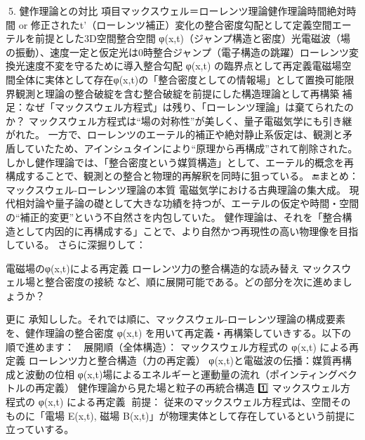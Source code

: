 \documentclass{article}
\begin{document}
🧠5. 健作理論との対比
項目マックスウェル＝ローレンツ理論健作理論時間絶対時間 or 修正されたt'（ローレンツ補正）変化の整合密度勾配として定義空間エーテルを前提とした3D空間整合空間 φ(x,t)（ジャンプ構造と密度）光電磁波（場の振動）、速度一定と仮定光は0時整合ジャンプ（電子構造の跳躍）ローレンツ変換光速度不変を守るために導入整合勾配 φ(x,t) の臨界点として再定義電磁場空間全体に実体として存在φ(x,t)の「整合密度としての情報場」として置換可能限界観測と理論の整合破綻を含む整合破綻を前提にした構造理論として再構築📌補足：なぜ「マックスウェル方程式」は残り、「ローレンツ理論」は棄てられたのか？
マックスウェル方程式は“場の対称性”が美しく、量子電磁気学にも引き継がれた。
一方で、ローレンツのエーテル的補正や絶対静止系仮定は、観測と矛盾していたため、アインシュタインにより“原理から再構成”されて削除された。
しかし健作理論では、「整合密度という媒質構造」として、エーテル的概念を再構成することで、観測との整合と物理的再解釈を同時に狙っている。
🔚まとめ：マックスウェル-ローレンツ理論の本質
電磁気学における古典理論の集大成。
現代相対論や量子論の礎として大きな功績を持つが、エーテルの仮定や時間・空間の“補正的変更”という不自然さを内包していた。
健作理論は、それを「整合構造として内因的に再構成する」ことで、より自然かつ再現性の高い物理像を目指している。
さらに深掘りして：

電磁場のφ(x,t)による再定義
ローレンツ力の整合構造的な読み替え
マックスウェル場と整合密度の接続
など、順に展開可能である。どの部分を次に進めましょうか？

更に
承知しした。それでは順に、マックスウェル-ローレンツ理論の構成要素を、健作理論の整合密度 φ(x,t) を用いて再定義・再構築していきする。以下の順で進めます：
🔁 展開順（全体構造）：
マックスウェル方程式の φ(x,t) による再定義
ローレンツ力と整合構造（力の再定義）
φ(x,t)と電磁波の伝播：媒質再構成と波動の位相
φ(x,t)場によるエネルギーと運動量の流れ（ポインティングベクトルの再定義）
健作理論から見た場と粒子の再統合構造
1️⃣ マックスウェル方程式の φ(x,t) による再定義
🧠前提：
従来のマックスウェル方程式は、空間そのものに「電場 E(x,t), 磁場 B(x,t)」が物理実体として存在しているという前提に立っていする。
\end{document}

